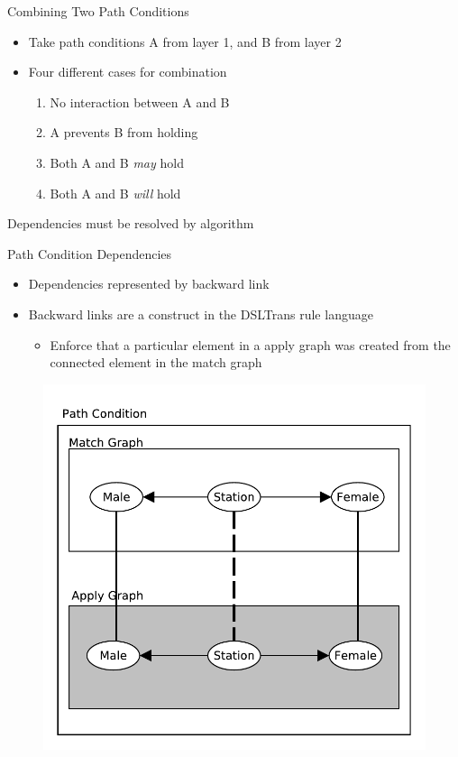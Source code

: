 \documentclass[xcolor=dvipsnames, 14pt]{beamer}
\begin{document}
\begin{frame}{Combining Two Path Conditions}
\begin{itemize}
\item Take path conditions A from layer 1, and B from layer 2
\item Four different cases for combination
\begin{enumerate}
\item No interaction between A and B
\item A prevents B from holding
\item Both A and B \textit{may} hold
\item Both A and B \textit{will} hold
\end{enumerate}
\end{itemize}
Dependencies must be resolved by algorithm
\end{frame}

\begin{frame}{Path Condition Dependencies}
\begin{itemize}
\item Dependencies represented by backward link
\item Backward links are a construct in the DSLTrans rule language
\begin{itemize}
\item Enforce that a particular element in a apply graph was created from the connected element in the match graph
\end{itemize}
\end{itemize}
\begin{figure}[t]
                \centering
                \includegraphics[height=0.66\textheight]{../figures/building_path_conditions/collapse_merge_apply.pdf}
                \label{fig:collapse_merge_match}
\end{figure}
\end{frame}
\end{document}
